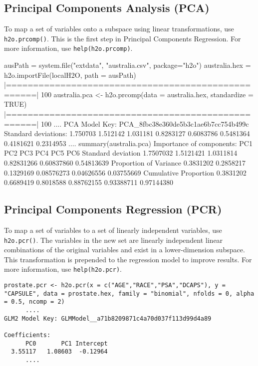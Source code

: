\subsection{Principal Components Analysis (PCA)}

To map a set of variables onto a subspace using linear transformations, use {\texttt{h2o.prcomp()}}. This is the first step in Principal Components Regression. For more information, use {\texttt{help(h2o.prcomp)}}.
\begin{spverbatim}
ausPath = system.file("extdata", "australia.csv", package="h2o")
australia.hex = h2o.importFile(localH2O, path = ausPath)
|===================================================| 100%
australia.pca <- h2o.prcomp(data = australia.hex, standardize = TRUE)
|===================================================| 100%
      ....
PCA Model Key: PCA_8fbc38e360de5b3c1ae6b7cc754b499c
Standard deviations:
 1.750703 1.512142 1.031181 0.8283127 0.6083786 0.5481364 0.4181621 0.2314953
      ....
summary(australia.pca)
Importance of components: PC1       PC2       PC3        PC4        PC5        PC6
Standard deviation     1.7507032 1.5121421 1.0311814 0.82831266 0.60837860 0.54813639 
Proportion of Variance 0.3831202 0.2858217 0.1329169 0.08576273 0.04626556 0.03755669
Cumulative Proportion  0.3831202 0.6689419 0.8018588 0.88762155 0.93388711 0.97144380
\end{spverbatim}

\subsection{Principal Components Regression (PCR)}

To map a set of variables to a set of linearly independent variables, use {\texttt{h2o.pcr()}}. The variables in the new set are linearly independent linear combinations of the original variables and exist in a lower-dimension subspace. This transformation is prepended to the regression model to improve results. For more information, use {\texttt{help(h2o.pcr)}}.
\begin{lstlisting}[breaklines,basicstyle=\ttfamily]
prostate.pcr <- h2o.pcr(x = c("AGE","RACE","PSA","DCAPS"), y = "CAPSULE", data = prostate.hex, family = "binomial", nfolds = 0, alpha = 0.5, ncomp = 2)
      ....
GLM2 Model Key: GLMModel__a71b8209871c4a70d037f113d99d4a89

Coefficients:
      PC0       PC1 Intercept 
  3.55117   1.08603  -0.12964
      ....
\end{lstlisting}


